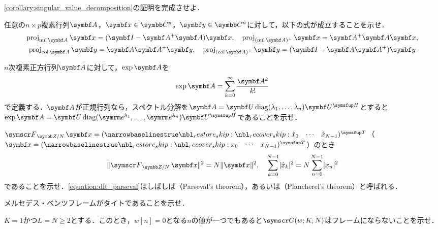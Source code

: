 \documentclass[../../main]{subfiles}
\begin{document}
\begin{problemenum}
  \item \cref{corollary:singular_value_decomposition}の証明を完成させよ．
  \item 任意の\(n\times p\)複素行列\(\mat{A}\)，\(\vect{x}\in\numset{C}^p\)，\(\vect{y}\in\numset{C}^n\)に対して，以下の式が成立することを示せ．
    \begin{gather*}
      \proj_{\nulsp\mat{A}}\vect{x} = (\imat-\pinv{\mat{A}}\mat{A})\vect{x},
      \quad\proj_{\pcomp{(\nulsp\mat{A})}}\vect{x} = \pinv{\mat{A}}\mat{A}\vect{x}, \\
      \proj_{\colsp\mat{A}}\vect{y} = \mat{A}\pinv{\mat{A}}\vect{y},
      \quad\proj_{\pcomp{(\colsp\mat{A})}}\vect{y} = (\imat-\mat{A}\pinv{\mat{A}})\vect{y}
    \end{gather*}
  \item \(n\)次複素正方行列\(\mat{A}\)に対して，\(\exp\mat{A}\)を
    \[
      \exp\mat{A} = \sum_{k=0}^\infty\frac{\mat{A}^k}{k!}
    \]
    で定義する．\(\mat{A}\)が正規行列なら，スペクトル分解を\(\mat{A}=\mat{U}\diag(\lambda_1,\dots,\lambda_n)\htrps{\mat{U}}\)とすると\(\exp\mat{A}=\mat{U}\diag(\napr^{\lambda_1},\dots,\napr^{\lambda_n})\htrps{\mat{U}}\)であることを示せ．
  \item \label{problem:parseval}\(\dft{N}\vect{x}=\trps{\rowvect{\hat{x}_0 & \cdots & \hat{x}_{N-1}}}\)（\(\vect{x}=\trps{\rowvect{x_0 & \cdots & x_{N-1}}}\)）のとき
    \begin{equation}
      \label{equation:dft_parseval}
      \vnorm{\dft{N}\vect{x}}^2 = N\vnorm{\vect{x}}^2,
      \quad \sum_{k=0}^{N-1}\abs{\hat{x}_k}^2 = N\sum_{n=0}^{N-1}\abs{x_n}^2
    \end{equation}
    であることを示せ．\cref{equation:dft_parseval}はしばしば（Parseval's theorem），あるいは（Plancherel's theorem）と呼ばれる．
  \item \label{problem:mercedes_benz}メルセデス・ベンツフレームがタイトであることを示せ．
  \item \label{problem:gabor}\(K=1\)かつ\(L=N\geq 2\)とする．このとき，\(w[n]=0\)となる\(n\)の値が一つでもあると\(\gaborsys{w}{K}{N}\)はフレームにならないことを示せ．
\end{problemenum}
\end{document}
